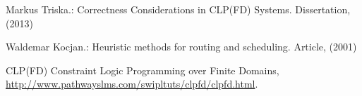 \documentclass[runningheads]{llncs}
\begin{document}
%
%
% 
% 
%
\begin{thebibliography}{8}
Markus Triska.: Correctness Considerations in CLP(FD) Systems. Dissertation, (2013)

Waldemar Kocjan.: Heuristic methods for routing and scheduling. Article, (2001)

CLP(FD) Constraint Logic Programming over Finite Domains, \url{http://www.pathwayslms.com/swipltuts/clpfd/clpfd.html}. 
\end{thebibliography}
\end{document}
